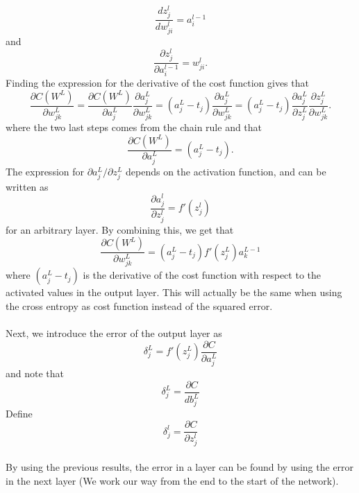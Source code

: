 \begin{equation}
    \frac{d z_j^l}{d w_{ji}^l} = a_i^{l-1}
\end{equation}
and  
\begin{equation}
    \frac{\partial z_j^l}{\partial a_i^{l-1}} = w_{ji}^l.
\end{equation}
 Finding the expression for the derivative of the cost function gives that
\begin{equation}
    \frac{\partial C(W^L)}{\partial w_{jk}^L} = \frac{\partial C(W^L)}{\partial a_j^L}\frac{\partial a_j^L}{\partial w_{jk}^L} = (a_j^L - t_j)\frac{\partial a_j^L}{\partial w_{jk}^L} = (a_j^L - t_j)\frac{\partial a_j^L}{\partial z_j^L}\frac{\partial z_j^L}{\partial w_{jk}^L}.
\end{equation}
where the two last steps comes from the chain rule and that 
\begin{equation}
    \frac{\partial C(W^L)}{\partial a_j^L} = (a_j^L - t_j).
\end{equation} 
The expression for $\partial a_j^L/\partial z_j^L$ depends on the activation function, and can be written as 
\begin{equation}
    \frac{\partial a_j^l}{\partial z_j^l} = f'(z_j^l) 
\end{equation}
for an arbitrary layer. By combining this, we get that 
\begin{equation}
     \frac{\partial C(W^L)}{\partial w_{jk}^L} = (a_j^L - t_j) f'(z_j^L) a_k^{L-1}
\end{equation}
where $(a_j^L - t_j)$ is the derivative of the cost function with respect to the activated values in the output layer. This will actually be the same when using the cross entropy as cost function instead of the squared error. 
\\
\\
Next, we introduce the error of the output layer as 
\begin{equation}
    \delta_j^L = f'(z_j^L)\frac{\partial C}{\partial a_j^L}
\end{equation}
and note that
\begin{equation}
    \delta_j^L = \frac{\partial C}{db_j^L}
\end{equation}
Define
\begin{equation}
    \delta_j^l = \frac{\partial C}{\partial z_j^l}
\end{equation}
\\
By using the previous results, the error in a layer can be found by using the error in the next layer (We work our way from the end to the start of the network). 
